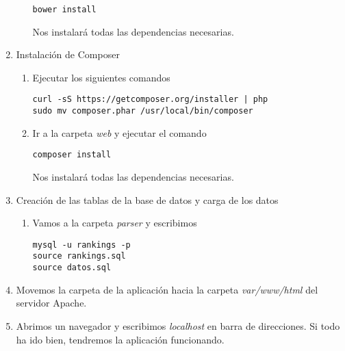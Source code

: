 \begin{enumerate}
\begin{enumerate}
\begin{verbatim}
bower install
\end{verbatim} 

Nos instalará todas las dependencias necesarias.
\end{enumerate}

\item Instalación de Composer

\begin{enumerate}
\item Ejecutar los siguientes comandos

\begin{verbatim}
curl -sS https://getcomposer.org/installer | php
sudo mv composer.phar /usr/local/bin/composer
\end{verbatim} 

\item Ir a la carpeta \emph{web} y ejecutar el comando 

\begin{verbatim}
composer install
\end{verbatim}

Nos instalará todas las dependencias necesarias.

\end{enumerate}

\item Creación de las tablas de la base de datos y carga de los datos

\begin{enumerate}
\item Vamos a la carpeta \emph{parser} y escribimos

\begin{verbatim}
mysql -u rankings -p
source rankings.sql
source datos.sql
\end{verbatim}

\end{enumerate}

\item Movemos la carpeta de la aplicación hacia la carpeta \emph{var/www/html} del servidor Apache.

\item Abrimos un navegador y escribimos \emph{localhost} en barra de direcciones. Si todo ha ido bien, tendremos la aplicación funcionando.

\end{enumerate}